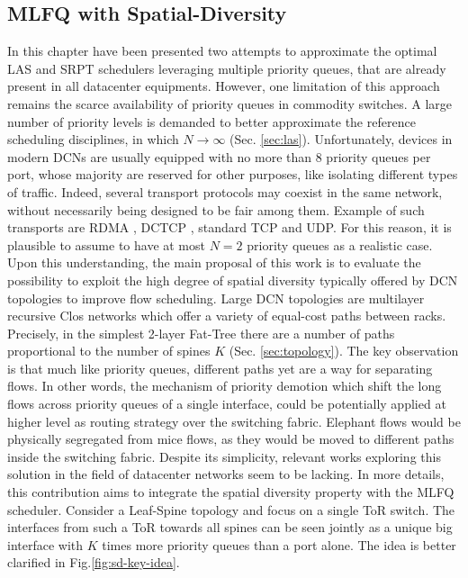 \subsection{MLFQ with Spatial-Diversity}
In this chapter have been presented two attempts to approximate the optimal LAS and SRPT schedulers leveraging multiple priority queues, that are already present in all datacenter equipments. However, one limitation of this approach remains the scarce availability of priority queues in commodity switches. A large number of priority levels is demanded to better approximate the reference scheduling disciplines, in which $N \rightarrow \infty$ (Sec. \ref{sec:las}). Unfortunately, devices in modern DCNs are usually equipped with no more than 8 priority queues per port, whose majority are reserved for other purposes, like isolating different types of traffic. Indeed, several transport protocols may coexist in the same network, without necessarily being designed to be fair among them. Example of such transports are RDMA \cite{rdma}, DCTCP \cite{dctcp}, standard TCP and UDP. For this reason, it is plausible to assume to have at most $N=2$ priority queues as a realistic case. \\
Upon this understanding, the main proposal of this work is to evaluate the possibility to exploit the high degree of spatial diversity typically offered by DCN topologies to improve flow scheduling. Large DCN topologies are multilayer recursive Clos networks which offer a variety of equal-cost paths between racks. Precisely, in the simplest 2-layer Fat-Tree there are a number of paths proportional to the number of spines $K$ (Sec. \ref{sec:topology}). The key observation is that much like priority queues, different paths yet are a way for separating flows. In other words, the mechanism of priority demotion which shift the long flows across priority queues of a single interface, could be potentially applied at higher level as routing strategy over the switching fabric. Elephant flows would be physically segregated from mice flows, as they would be moved to different paths inside the switching fabric. Despite its simplicity, relevant works exploring this solution in the field of datacenter networks seem to be lacking. In more details, this contribution aims to integrate the spatial diversity property with the MLFQ scheduler. Consider a Leaf-Spine topology and focus on a single ToR switch. The interfaces from such a ToR towards all spines can be seen jointly as a unique big interface with $K$ times more priority queues than a port alone. The idea is better clarified in Fig.\ref{fig:sd-key-idea}.
